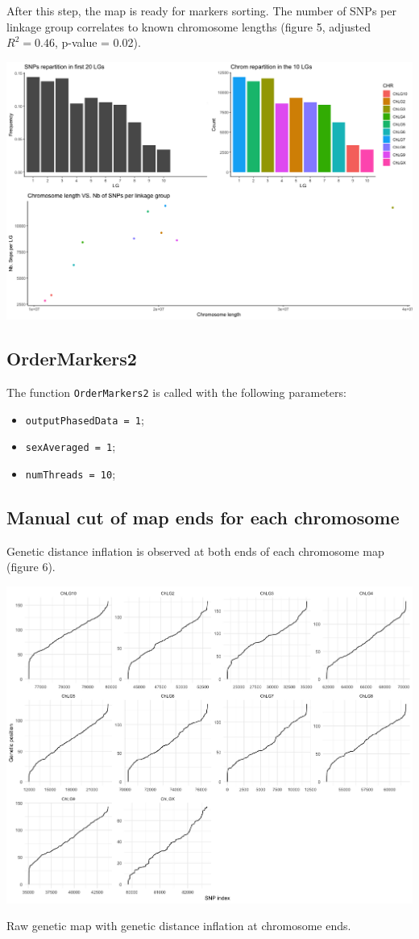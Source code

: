 \documentclass[english, a4paper, 12pt]{article}
\makeatletter
\newenvironment{figurehere}
{\def\@captype{figure}}
{}
\makeatother
\begin{document}
After this step, the map is ready for markers sorting. The number of SNPs per linkage group correlates to known chromosome lengths (figure 5, adjusted $R^2=0.46$, p-value = 0.02).

\hfill

\begin{figurehere}
\centering
\includegraphics[width=1\linewidth]{figure5.png}
\end{figurehere}

\subsection{OrderMarkers2}

The function \texttt{OrderMarkers2} is called with the following parameters:
\begin{itemize}
\item \texttt{outputPhasedData = 1};
\item \texttt{sexAveraged = 1};
\item \texttt{numThreads = 10};
\end{itemize}

\subsection{Manual cut of map ends for each chromosome}

Genetic distance inflation is observed at both ends of each chromosome map (figure 6).

\hfill

\begin{figurehere}
\centering
\includegraphics[width=0.51\linewidth]{figure6.png}
\caption{\small{Raw genetic map with genetic distance inflation at chromosome ends.}}
\end{figurehere}
\end{document}
